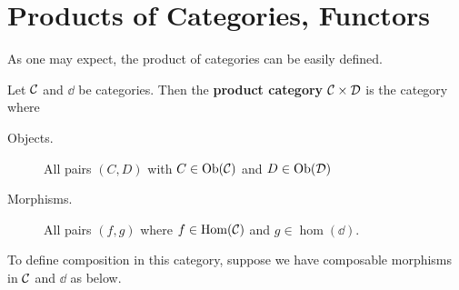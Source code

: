    \newpage
    \section{Products of Categories, Functors}
    As one may expect, the product of categories can be easily
    defined.
    
    \begin{definition}
        Let $\mathcal{C}$ and $\dd$ be categories. Then the \textbf{product
        category} $\mathcal{C} \times \mathcal{D}$ is the category where 
        \begin{description}
            \item[Objects.] All pairs  $(C, D)$ with $C \in \operatorname{\mathrm{Ob}}(\mathcal{C})$ and $D \in \operatorname{\mathrm{Ob}}(\mathcal{D})$
            \item[Morphisms.] All pairs $(f, g)$ where $f \in \operatorname{\mathrm{Hom}}(\mathcal{C})$ and $g \in \hom(\dd)$.   
        \end{description}
        To define composition in this category, suppose we have composable morphisms in $\mathcal{C}$ 
        and $\dd$ as below. 
        \begin{center}
\end{center}
\end{definition}
